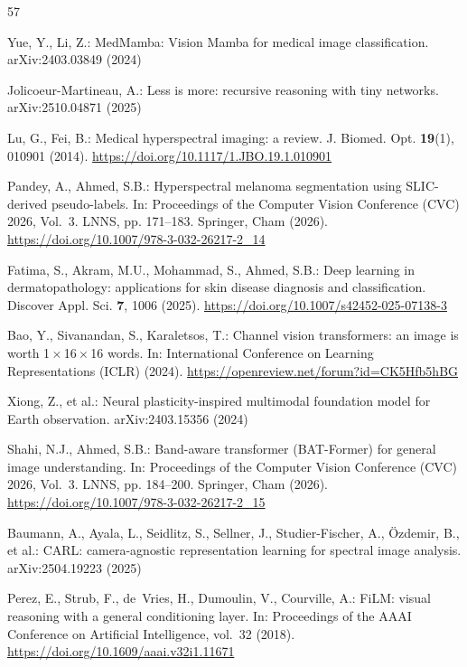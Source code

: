 \documentclass{svproc}
\begin{document}
\FloatBarrier
\begin{thebibliography}{57}

Yue, Y., Li, Z.: MedMamba: Vision Mamba for medical image classification. arXiv:2403.03849 (2024)

Jolicoeur-Martineau, A.: Less is more: recursive reasoning with tiny networks. arXiv:2510.04871 (2025)

Lu, G., Fei, B.: Medical hyperspectral imaging: a review. J. Biomed. Opt. \textbf{19}(1), 010901 (2014). \url{https://doi.org/10.1117/1.JBO.19.1.010901}

Pandey, A., Ahmed, S.B.: Hyperspectral melanoma segmentation using SLIC-derived pseudo-labels. In: Proceedings of the Computer Vision Conference (CVC) 2026, Vol.~3. LNNS, pp. 171--183. Springer, Cham (2026). \url{https://doi.org/10.1007/978-3-032-26217-2_14}

Fatima, S., Akram, M.U., Mohammad, S., Ahmed, S.B.: Deep learning in dermatopathology: applications for skin disease diagnosis and classification. Discover Appl. Sci. \textbf{7}, 1006 (2025). \url{https://doi.org/10.1007/s42452-025-07138-3}

Bao, Y., Sivanandan, S., Karaletsos, T.: Channel vision transformers: an image is worth 1\,$\times$\,16\,$\times$\,16 words. In: International Conference on Learning Representations (ICLR) (2024). \url{https://openreview.net/forum?id=CK5Hfb5hBG}

Xiong, Z., et al.: Neural plasticity-inspired multimodal foundation model for Earth observation. arXiv:2403.15356 (2024)

Shahi, N.J., Ahmed, S.B.: Band-aware transformer (BAT-Former) for general image understanding. In: Proceedings of the Computer Vision Conference (CVC) 2026, Vol.~3. LNNS, pp. 184--200. Springer, Cham (2026). \url{https://doi.org/10.1007/978-3-032-26217-2_15}

Baumann, A., Ayala, L., Seidlitz, S., Sellner, J., Studier-Fischer, A., \"{O}zdemir, B., et al.: CARL: camera-agnostic representation learning for spectral image analysis. arXiv:2504.19223 (2025)

Perez, E., Strub, F., de~Vries, H., Dumoulin, V., Courville, A.: FiLM: visual reasoning with a general conditioning layer. In: Proceedings of the AAAI Conference on Artificial Intelligence, vol.~32 (2018). \url{https://doi.org/10.1609/aaai.v32i1.11671}


\end{thebibliography}
\end{document}
